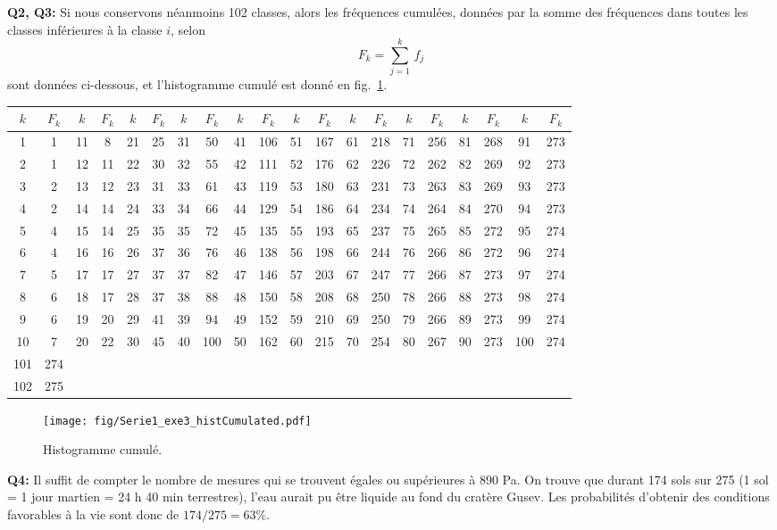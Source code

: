 \textbf{Q2, Q3:} Si nous conservons néanmoins 102 classes, alors les fréquences cumulées, données par la somme des fréquences dans toutes les classes inférieures à la classe $i$, selon
$$
F_k=\sum\limits_{j=1}^{k}\,f_j
$$
sont données ci-dessous, et l'histogramme cumulé est donné en fig.~\ref{fig:ch}.
\begin{center}
\scriptsize
\begin{tabular}{cccccccccccccccccccc}
$k$ & $F_k$ & $k$ & $F_k$ & $k$ & $F_k$ & $k$ & $F_k$ & $k$ & $F_k$ & $k$ & $F_k$ & $k$ & $F_k$ & $k$ & $F_k$ & $k$ & $F_k$ & $k$ & $F_k$ \\\hline
 1 & 1 & 11 &  8 & 21 & 25 & 31 &  50 & 41 & 106 & 51 & 167 & 61 & 218 & 71 & 256 & 81 & 268 &  91 & 273\\
 2 & 1 & 12 & 11 & 22 & 30 & 32 &  55 & 42 & 111 & 52 & 176 & 62 & 226 & 72 & 262 & 82 & 269 &  92 & 273\\
 3 & 2 & 13 & 12 & 23 & 31 & 33 &  61 & 43 & 119 & 53 & 180 & 63 & 231 & 73 & 263 & 83 & 269 &  93 & 273\\
 4 & 2 & 14 & 14 & 24 & 33 & 34 &  66 & 44 & 129 & 54 & 186 & 64 & 234 & 74 & 264 & 84 & 270 &  94 & 273\\
 5 & 4 & 15 & 14 & 25 & 35 & 35 &  72 & 45 & 135 & 55 & 193 & 65 & 237 & 75 & 265 & 85 & 272 &  95 & 274\\
 6 & 4 & 16 & 16 & 26 & 37 & 36 &  76 & 46 & 138 & 56 & 198 & 66 & 244 & 76 & 266 & 86 & 272 &  96 & 274\\
 7 & 5 & 17 & 17 & 27 & 37 & 37 &  82 & 47 & 146 & 57 & 203 & 67 & 247 & 77 & 266 & 87 & 273 &  97 & 274\\
 8 & 6 & 18 & 17 & 28 & 37 & 38 &  88 & 48 & 150 & 58 & 208 & 68 & 250 & 78 & 266 & 88 & 273 &  98 & 274\\
 9 & 6 & 19 & 20 & 29 & 41 & 39 &  94 & 49 & 152 & 59 & 210 & 69 & 250 & 79 & 266 & 89 & 273 &  99 & 274\\
10 & 7 & 20 & 22 & 30 & 45 & 40 & 100 & 50 & 162 & 60 & 215 & 70 & 254 & 80 & 267 & 90 & 273 & 100 & 274\\
101 & 274 \\
102 & 275 \\\hline
\end{tabular}
\normalsize
\end{center}

\begin{figure}
   \centering
   \vspace{-5mm}
   \texttt{[image: fig/Serie1\_exe3\_histCumulated.pdf]}
   \caption{Histogramme cumulé.}
   \label{fig:ch}
\end{figure}
\textbf{Q4:} Il suffit de compter le nombre de mesures qui se trouvent égales ou supérieures à 890 Pa. On trouve que durant 174 sols sur 275 (1 sol = 1 jour martien = 24 h 40 min terrestres), l'eau aurait pu être liquide au fond du cratère Gusev. Les probabilités d'obtenir des conditions favorables à la vie sont donc de $174/275=63\%$.

